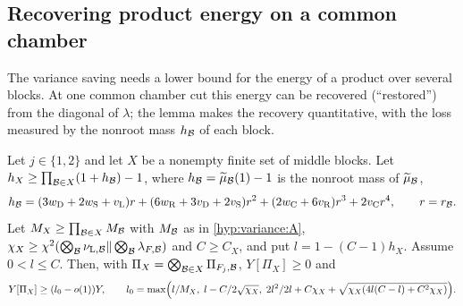 \subsection{Recovering product energy on a common chamber}\label{subsec:variance:restoration}

The variance saving needs a lower bound for the energy of a
product over several blocks. At one common chamber cut this energy
can be recovered (``restored'') from the diagonal of $\lambda$; the
lemma makes the recovery quantitative, with the loss measured by
the nonroot mass $h_\Blk$ of each block.

\begin{lemma}\label{lem:record:restoration}
Let $j\in\{1,2\}$ and let $X$ be a nonempty finite set of middle blocks. Let
$h_X\ge\prod_{\Blk\in X}(1+h_\Blk)-1$, where $h_\Blk=\widetilde\mu_\Blk(1)-1$
is the nonroot mass of $\widetilde\mu_\Blk$,
\begin{equation}\label{eq:record:nonroot-mass}
 h_\Blk=(3w_{\rm D}+2w_{\rm S}+v_{\rm L})r+(6w_{\rm R}+3v_{\rm D}+2v_{\rm S})r^2
 +(2w_{\rm C}+6v_{\rm R})r^3+2v_{\rm C}r^4,
 \qquad r=r_\Blk .
\end{equation}
Let $M_X\ge\prod_{\Blk\in X}M_\Blk$ with $M_\Blk$ as in \cref{hyp:variance:A},
$\chi_X\ge\chi^2(\bigotimes_\Blk\nu_{\mathrm L,\Blk}\|\bigotimes_\Blk
\lambda_{F,\Blk})$ and $C\ge C_X$, and put $l=1-(C-1)h_X$. Assume $0<l\le C$.
Then, with $\Pi_X=\bigotimes_{\Blk\in X}\Pi_{F_j,\Blk}$, $Y[\Pi_X]\ge0$ and
\[
 Y[\Pi_X]\ge(l_0-o(1))Y,\qquad
 l_0=\max\Bigl(\frac l{M_X},\;l-\frac C2\sqrt{\chi_X},\;
 \frac{2l^2}{2l+C\chi_X+\sqrt{\chi_X(4l(C-l)+C^2\chi_X)}}\Bigr).
\]
\end{lemma}

